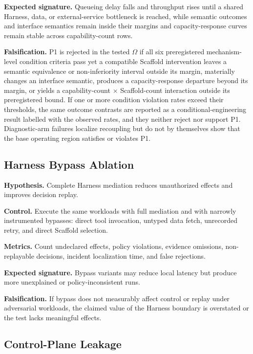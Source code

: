 \textbf{Expected signature.} Queueing delay falls and throughput rises until a shared Harness, data, or external-service bottleneck is reached, while semantic outcomes and interface semantics remain inside their margins and capacity-response curves remain stable across capability-count rows.

\textbf{Falsification.} P1 is rejected in the tested $\Omega$ if all six preregistered mechanism-level condition criteria pass yet a compatible Scaffold intervention leaves a semantic equivalence or non-inferiority interval outside its margin, materially changes an interface semantic, produces a capacity-response departure beyond its margin, or yields a capability-count $\times$ Scaffold-count interaction outside its preregistered bound. If one or more condition violation rates exceed their thresholds, the same outcome contrasts are reported as a conditional-engineering result labelled with the observed rates, and they neither reject nor support P1. Diagnostic-arm failures localize recoupling but do not by themselves show that the base operating region satisfies or violates P1.

\subsection{Harness Bypass Ablation}
\label{sec:eval-bypass}

\textbf{Hypothesis.} Complete Harness mediation reduces unauthorized effects and improves decision replay.

\textbf{Control.} Execute the same workloads with full mediation and with narrowly instrumented bypasses: direct tool invocation, untyped data fetch, unrecorded retry, and direct Scaffold selection.

\textbf{Metrics.} Count undeclared effects, policy violations, evidence omissions, non-replayable decisions, incident localization time, and false rejections.

\textbf{Expected signature.} Bypass variants may reduce local latency but produce more unexplained or policy-inconsistent runs.

\textbf{Falsification.} If bypass does not measurably affect control or replay under adversarial workloads, the claimed value of the Harness boundary is overstated or the test lacks meaningful effects.

\subsection{Control-Plane Leakage}
\label{sec:eval-leakage}

